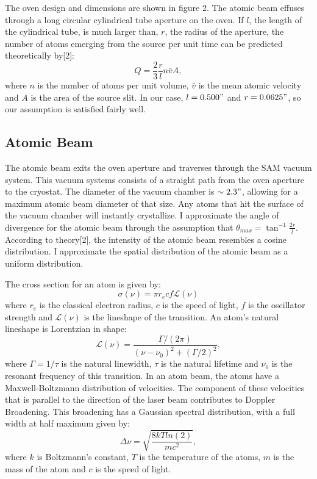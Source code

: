 \documentclass[12pt, a4paper]{article}
\begin{document}
The oven design and dimensions are shown in figure 2. The atomic beam effuses through a long circular cylindrical tube aperture on the oven. If $l$, the length of the cylindrical tube, is much larger than, $r$, the radius of the aperture, the number of atoms emerging from the source per unit time can be predicted theoretically by[2]:
\begin{equation}
Q = \frac{2}{3}\frac{r}{l}n\bar{v}A,
\end{equation}
where $n$ is the number of atoms per unit volume, $\bar{v}$ is the mean atomic velocity and $A$ is the area of the source slit. In our case, $l = 0.500"$ and $r = 0.0625"$, so our assumption is satisfied fairly well.

\subsection{Atomic Beam}
The atomic beam exits the oven aperture and traverses through the SAM vacuum system. This vacuum systems consists of a straight path from the oven aperture to the cryostat. The diameter of the vacuum chamber is $\sim 2.3"$, allowing for a maximum atomic beam diameter of that size. Any atoms that hit the surface of the vacuum chamber will instantly crystallize. I approximate the angle of divergence for the atomic beam through the assumption that $\theta_{max} = \tan^{-1}\frac{2r}{l}$. According to theory[2], the intensity of the atomic beam resembles a cosine distribution. I approximate the spatial distribution of the atomic beam as a uniform distribution.

The cross section for an atom is given by:
\begin{equation}
\sigma(\nu) = \pi r_e c f \mathscr{L}(\nu)
\end{equation}
where $r_e$ is the classical electron radius, $c$ is the speed of light, $f$ is the oscillator strength and $\mathscr{L}(\nu)$ is the lineshape of the transition. An atom's natural lineshape is Lorentzian in shape:
\begin{equation}
\mathscr{L}(\nu) = \frac{\Gamma/(2 \pi)}{(\nu-\nu_0)^2+(\Gamma/2)^2},
\end{equation}
where $\Gamma = 1/\tau$ is the natural linewidth, $\tau$ is the natural lifetime and $\nu_0$ is the resonant frequency of this transition. In an atom beam, the atoms have a Maxwell-Boltzmann distribution of velocities. The component of these velocities that is parallel to the direction of the laser beam contributes to Doppler Broadening. This broadening has a Gaussian spectral distribution, with a full width at half maximum given by:
\begin{equation}
\Delta \nu = \sqrt{\frac{8kT ln(2)}{mc^2}},
\end{equation}
where $k$ is Boltzmann's constant, $T$ is the temperature of the atoms, $m$ is the mass of the atom and $c$ is the speed of light.
\end{document}
